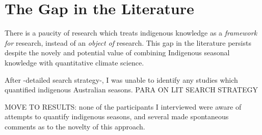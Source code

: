 \section{The Gap in the Literature}

There is a paucity of research which treats indigenous knowledge
as a \emph{framework for} research, instead of an \emph{object of} research.
This gap in the literature persists despite the novely and potential value
of combining Indigenous seasonal knowledge with quantitative climate science.

After -detailed search strategy-, I was unable to identify any studies which 
quantified indigenous Australian seasons.  PARA ON LIT SEARCH STRATEGY


MOVE TO RESULTS: none of the participants I interviewed were aware of
attempts to quantify indigenous seasons, and several made spontaneous
comments as to the novelty of this approach.





